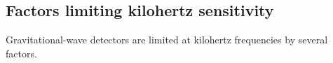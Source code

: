 

\subsection{Factors limiting kilohertz sensitivity}
\label{sec:intro_factors_limiting_kHz}

Gravitational-wave detectors are limited at kilohertz frequencies by several factors.


